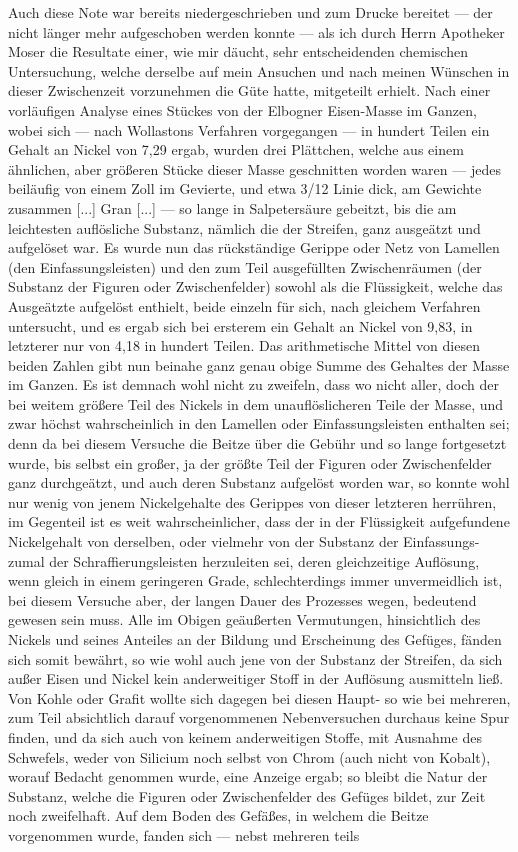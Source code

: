 \documentclass[a4paper, 11pt, oneside, german]{article}
\begin{document}
Auch diese Note war bereits niedergeschrieben und zum Drucke bereitet --- der nicht länger mehr aufgeschoben werden konnte --- als ich durch Herrn Apotheker Moser die Resultate einer, wie mir däucht, sehr entscheidenden chemischen Untersuchung, welche derselbe auf mein Ansuchen und nach meinen Wünschen in dieser Zwischenzeit vorzunehmen die Güte hatte, mitgeteilt erhielt. Nach einer vorläufigen Analyse eines Stückes von der Elbogner Eisen-Masse im Ganzen, wobei sich --- nach Wollastons Verfahren vorgegangen --- in hundert Teilen ein Gehalt an Nickel von 7,29 ergab, wurden drei Plättchen, welche aus einem ähnlichen, aber größeren Stücke dieser Masse geschnitten worden waren --- jedes beiläufig von einem Zoll im Gevierte, und etwa 3/12 Linie dick, am Gewichte zusammen [...] Gran [...] --- so lange in Salpetersäure gebeitzt, bis die am leichtesten auflösliche Substanz, nämlich die der Streifen, ganz ausgeätzt und aufgelöset war. Es wurde nun das rückständige Gerippe oder Netz von Lamellen (den Einfassungsleisten) und den zum Teil ausgefüllten Zwischenräumen (der Substanz der Figuren oder Zwischenfelder) sowohl als die Flüssigkeit, welche das Ausgeätzte aufgelöst enthielt, beide einzeln für sich, nach gleichem Verfahren untersucht, und es ergab sich bei ersterem ein Gehalt an Nickel von 9,83, in letzterer nur von 4,18 in hundert Teilen. Das arithmetische Mittel von diesen beiden Zahlen gibt nun beinahe ganz genau obige Summe des Gehaltes der Masse im Ganzen. Es ist demnach wohl nicht zu zweifeln, dass wo nicht aller, doch der bei weitem größere Teil des Nickels in dem unauflöslicheren Teile der Masse, und zwar höchst wahrscheinlich in den Lamellen oder Einfassungsleisten enthalten sei; denn da bei diesem Versuche die Beitze über die Gebühr und so lange fortgesetzt wurde, bis selbst ein großer, ja der größte Teil der Figuren oder Zwischenfelder ganz durchgeätzt, und auch deren Substanz aufgelöst worden war, so konnte wohl nur wenig von jenem Nickelgehalte des Gerippes von dieser letzteren herrühren, im Gegenteil ist es weit wahrscheinlicher, dass der in der Flüssigkeit aufgefundene Nickelgehalt von derselben, oder vielmehr von der Substanz der Einfassungs- zumal der Schraffierungsleisten herzuleiten sei, deren gleichzeitige Auflösung, wenn gleich in einem geringeren Grade, schlechterdings immer unvermeidlich ist, bei diesem Versuche aber, der langen Dauer des Prozesses wegen, bedeutend gewesen sein muss. Alle im Obigen geäußerten Vermutungen, hinsichtlich des Nickels und seines Anteiles an der Bildung und Erscheinung des Gefüges, fänden sich somit bewährt, so wie wohl auch jene von der Substanz der Streifen, da sich außer Eisen und Nickel kein anderweitiger Stoff in der Auflösung ausmitteln ließ. Von Kohle oder Grafit wollte sich dagegen bei diesen Haupt- so wie bei mehreren, zum Teil absichtlich darauf vorgenommenen Nebenversuchen durchaus keine Spur finden, und da sich auch von keinem anderweitigen Stoffe, mit Ausnahme des Schwefels, weder von Silicium noch selbst von Chrom (auch nicht von Kobalt), worauf Bedacht genommen wurde, eine Anzeige ergab; so bleibt die Natur der Substanz, welche die Figuren oder Zwischenfelder des Gefüges bildet, zur Zeit noch zweifelhaft. Auf dem Boden des Gefäßes, in welchem die Beitze vorgenommen wurde, fanden sich --- nebst mehreren teils 
\end{document}
